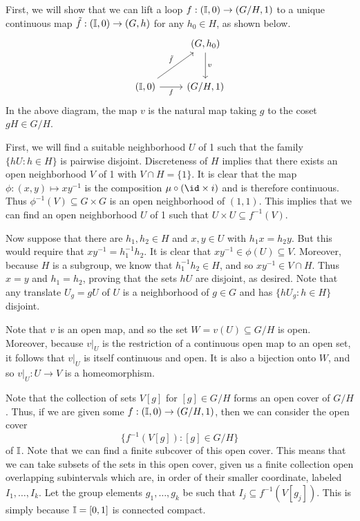 \documentclass[../../solutions.tex]{subfiles}
\begin{document}
\begin{exercise} \leavevmode
First, we will show that we can lift a loop $f:(\mathbb I,0)\to(G/H,1)$ to a unique continuous map $\tilde f:(\mathbb I,0)\to(G,h)$ for any $h_0\in H$, as shown below. 
\[\begin{tikzcd}[row sep=large]
    &(G,h_0)\arrow[d,"v"]\\
    (\II,0)\arrow[ur,"\tilde f"]\arrow[r,"f" swap]&(G/H,1)
\end{tikzcd}\]
In the above diagram, the map $v$ is the natural map taking $g$ to the coset $gH\in G/H$. 

First, we will find a suitable neighborhood $U$ of 1 such that the family $\{hU:h\in H\}$ is pairwise disjoint. 
Discreteness of $H$ implies that there exists an open neighborhood $V$ of 1 with $V\cap H=\{1\}$. 
It is clear that the map $\phi:(x,y)\mapsto xy^{-1}$ is the composition $\mu\circ(\id\times i)$ and is therefore continuous. 
Thus $\phi^{-1}(V)\subseteq G\times G$ is an open neighborhood of $(1,1)$. 
This implies that we can find an open neighborhood $U$ of 1 such that $U\times U\subseteq f^{-1}(V)$. 

Now suppose that there are $h_1,h_2\in H$ and $x,y\in U$ with $h_1x=h_2y$. 
But this would require that $xy^{-1}=h_1^{-1}h_2$. 
It is clear that $xy^{-1}\in\phi(U)\subseteq V$. 
Moreover, because $H$ is a subgroup, we know that $h_1^{-1}h_2\in H$, and so $xy^{-1}\in V\cap H$. 
Thus $x=y$ and $h_1=h_2$, proving that the sets $hU$ are disjoint, as desired. 
Note that any translate $U_g=gU$ of $U$ is a neighborhood of $g\in G$ and has $\{hU_g:h\in H\}$ disjoint. 

Note that $v$ is an open map, and so the set $W=v(U)\subseteq G/H$ is open. 
Moreover, because $v|_U$ is the restriction of a continuous open map to an open set, it follows that $v|_U$ is itself continuous and open. 
It is also a bijection onto $W$, and so $v|_U:U\to V$ is a homeomorphism. 

Note that the collection of sets $V[g]$ for $[g]\in G/H$ forms an open cover of $G/H$. 
Thus, if we are given some $f:(\mathbb I,0)\to(G/H,1)$, then we can consider the open cover \[\{f^{-1}(V[g]):[g]\in G/H\}\] of $\mathbb I$. 
Note that we can find a finite subcover of this open cover.
This means that we can take subsets of the sets in this open cover, given us a finite collection open overlapping subintervals which are, in order of their smaller coordinate, labeled $I_1,\dots,I_k$. 
Let the group elements $g_1,\dots,g_k$ be such that $I_j\subseteq f^{-1}(V[g_j])$. 
This is simply because $\mathbb I=[0,1]$ is connected compact. 


\end{exercise}
\end{document}
